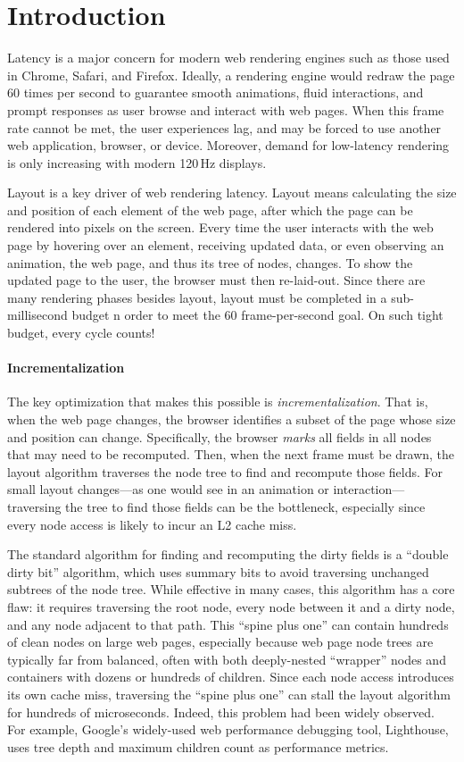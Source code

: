 
\section{Introduction}

Latency is a major concern for modern web rendering engines
  such as those used in Chrome, Safari, and Firefox.
Ideally, a rendering engine
  would redraw the page 60 times per second
  to guarantee smooth animations, fluid interactions,
  and prompt responses as user browse and interact with web pages.
When this frame rate cannot be met,
  the user experiences lag, and may be forced to use another web application, browser, or device.
Moreover, demand for low-latency rendering is only increasing
  with modern 120\,Hz displays.

Layout is a key driver of web rendering latency.
Layout means calculating the size and position
  of each element of the web page,
  after which the page can be rendered into pixels on the screen.
Every time the user interacts with the web page
  by hovering over an element,
  receiving updated data,
  or even observing an animation,
  the web page, and thus its tree of nodes, changes.
To show the updated page to the user,
  the browser must then re-laid-out.
Since there are many rendering phases besides layout,
  layout must be completed in a sub-millisecond budget 
  n order to meet the 60 frame-per-second goal.
On such tight budget, every cycle counts!

\paragraph{Incrementalization}
The key optimization that makes this possible is \emph{incrementalization}. That is, when the web page changes, the browser identifies a subset of the page whose size and position can change. Specifically, the browser \emph{marks} all fields in all nodes that may need to be recomputed. Then, when the next frame must be drawn, the layout algorithm traverses the node tree to find and recompute those fields. For small layout changes---as one would see in an animation or interaction---traversing the tree to find those fields can be the bottleneck, especially since every node access is likely to incur an L2 cache miss.

The standard algorithm for finding and recomputing the dirty fields is a ``double dirty bit'' algorithm, which uses summary bits to avoid traversing unchanged subtrees of the node tree. While effective in many cases, this algorithm has a core flaw: it requires traversing the root node, every node between it and a dirty node, and any node adjacent to that path. This ``spine plus one'' can contain hundreds of clean nodes on large web pages, especially because web page node trees are typically far from balanced, often with both deeply-nested ``wrapper'' nodes and containers with dozens or hundreds of children. Since each node access introduces its own cache miss, traversing the ``spine plus one'' can stall the layout algorithm for hundreds of microseconds. Indeed, this problem had been widely observed. For example, Google's widely-used web performance debugging tool, Lighthouse, uses tree depth and maximum children count as performance metrics.

